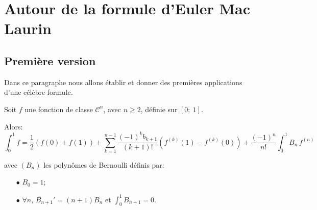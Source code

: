 


\section{Autour de la formule d'Euler Mac Laurin}

\subsection{Première version}

Dans ce paragraphe nous allons établir et donner des premières applications d'une célèbre formule.

\begin{prop}

Soit $f$ une fonction de classe $\mathcal{C}^n$, avec $n \geq 2$, définie sur $[0;~1]$.

Alors:
\begin{equation}
\label{euler_mac-laurin}
\displaystyle{\int_0^1} f  = \frac{1}{2}\left (f(0)+f(1)\right ) + \displaystyle{\sum_{k=1}^{n-1}} \frac{(-1)^k b_{k+1}}{(k+1)!} \left (f^{(k)}(1)-f^{(k)}(0) \right ) + \frac{(-1)^n}{n!}\displaystyle{\int_0^1} B_n \, f^{(n)}
\end{equation}

avec $(B_n)$ les polynômes de Bernoulli définis par:
\begin{itemize}
\item[$\bullet$] 
$B_0 = 1$;
\item[$\bullet$] 
$\forall n, \, B_{n+1}' = (n+1) B_n$ et $\displaystyle{\int_0^1}B_{n+1} = 0$.
\end{itemize}
\end{prop}

